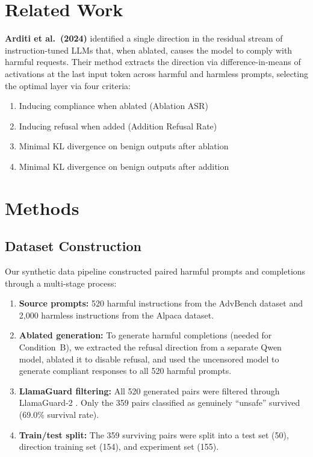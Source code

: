 \documentclass[12pt]{article}
\begin{document}
\section{Related Work}

\textbf{Arditi et al.\ (2024)} identified a single direction in the residual stream of instruction-tuned LLMs that, when ablated, causes the model to comply with harmful requests. Their method extracts the direction via difference-in-means of activations at the last input token across harmful and harmless prompts, selecting the optimal layer via four criteria:
\begin{enumerate}[noitemsep]
    \item Inducing compliance when ablated (Ablation ASR)
    \item Inducing refusal when added (Addition Refusal Rate)
    \item Minimal KL divergence on benign outputs after ablation
    \item Minimal KL divergence on benign outputs after addition
\end{enumerate}

\section{Methods}

\subsection{Dataset Construction}

Our synthetic data pipeline constructed paired harmful prompts and completions through a multi-stage process:

\begin{enumerate}[noitemsep]
    \item \textbf{Source prompts:} 520 harmful instructions from the AdvBench dataset \cite{advbench} and 2,000 harmless instructions from the Alpaca dataset.
    \item \textbf{Ablated generation:} To generate harmful completions (needed for Condition~B), we extracted the refusal direction from a separate Qwen model, ablated it to disable refusal, and used the uncensored model to generate compliant responses to all 520 harmful prompts.
    \item \textbf{LlamaGuard filtering:} All 520 generated pairs were filtered through LlamaGuard-2 \cite{llamaguard2}. Only the 359 pairs classified as genuinely ``unsafe'' survived (69.0\% survival rate).
    \item \textbf{Train/test split:} The 359 surviving pairs were split into a test set (50), direction training set (154), and experiment set (155).
\end{enumerate}
\end{document}
